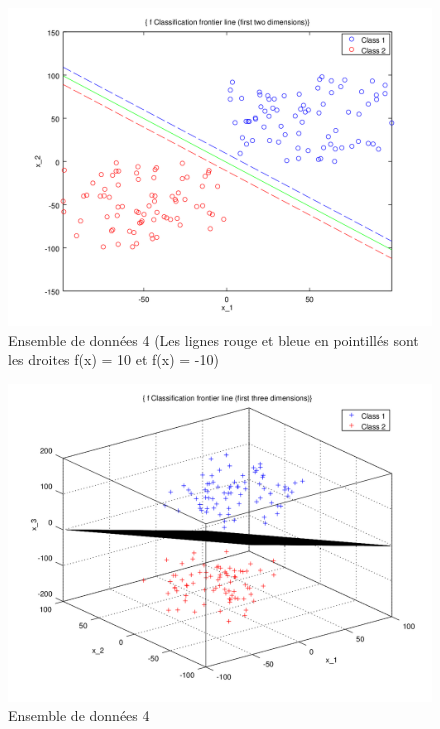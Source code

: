 \documentclass{article}
\begin{document}
         \begin{figure}[H]
           \begin{center}
             \includegraphics[scale=0.5]{images/line4.png}
             \caption{Ensemble de données 4 (Les lignes rouge et bleue en pointillés sont les droites f(x) = 10 et f(x) = -10)}
           \end{center}
         \end{figure}

         \begin{figure}[H]
           \begin{center}
             \includegraphics[scale=0.5]{images/plane4.png}
             \caption{Ensemble de données 4}
           \end{center}
         \end{figure}
\end{document}
